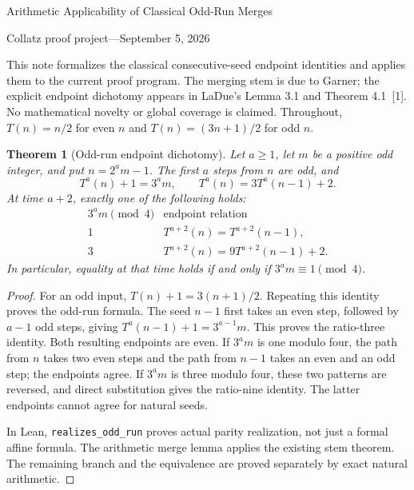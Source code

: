\documentclass[10pt]{article}
\newtheorem{theorem}{Theorem}
\begin{document}
\begin{center}
{\Large Arithmetic Applicability of Classical Odd-Run Merges}\par\medskip
Collatz proof project\quad---\quad September 5, 2026
\end{center}
This note formalizes the classical consecutive-seed endpoint identities
and applies them to the current proof program. The merging stem is due
to Garner; the explicit endpoint dichotomy appears in LaDue's Lemma 3.1
and Theorem 4.1\ [1]. No mathematical novelty or global coverage is claimed.
Throughout, $T(n)=n/2$ for even $n$ and $T(n)=(3n+1)/2$ for odd $n$.

\begin{theorem}[Odd-run endpoint dichotomy]
Let $a\geq1$, let $m$ be a positive odd integer, and put $n=2^am-1$.
The first $a$ steps from $n$ are odd, and
\[
T^a(n)+1=3^am,\qquad T^a(n)=3T^a(n-1)+2.
\]
At time $a+2$, exactly one of the following holds:
\[
\begin{array}{c|l}
3^am\pmod4&\text{endpoint relation}\\\hline
1&T^{a+2}(n)=T^{a+2}(n-1),\\
3&T^{a+2}(n)=9T^{a+2}(n-1)+2.
\end{array}
\]
In particular, equality at that time holds if and only if $3^am\equiv1\pmod4$.
\end{theorem}
\begin{proof}
For an odd input, $T(n)+1=3(n+1)/2$. Repeating this identity proves the
odd-run formula. The seed $n-1$ first takes an even step, followed by
$a-1$ odd steps, giving $T^a(n-1)+1=3^{a-1}m$. This proves the
ratio-three identity. Both resulting endpoints are even. If $3^am$ is
one modulo four, the path from $n$ takes two even steps and the path
from $n-1$ takes an even and an odd step; the endpoints agree.
If $3^am$ is three modulo four, these two patterns are reversed,
and direct substitution gives the ratio-nine identity. The latter
endpoints cannot agree for natural seeds.

In Lean, \texttt{realizes\_odd\_run} proves actual parity realization,
not just a formal affine formula. The arithmetic merge lemma
applies the existing stem theorem. The remaining branch and the equivalence
are proved separately by exact natural arithmetic.
\end{proof}
\end{document}
